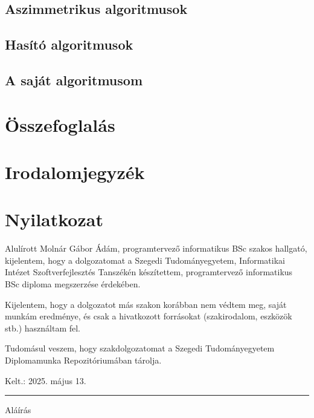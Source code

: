 \documentclass[12pt]{report} %
\begin{document}
\section{Aszimmetrikus algoritmusok} %

\section{Hasító algoritmusok} %

\section{A saját algoritmusom} %

\chapter{Összefoglalás} %

\chapter*{Irodalomjegyzék} %

\printbibliography[heading=none] %

\chapter*{Nyilatkozat} %

Alulírott Molnár Gábor Ádám, programtervező informatikus BSc szakos hallgató, kijelentem, hogy a dolgozatomat a Szegedi Tudományegyetem, Informatikai Intézet Szoftverfejlesztés Tanszékén készítettem, programtervező informatikus BSc diploma megszerzése érdekében.

Kijelentem, hogy a dolgozatot más szakon korábban nem védtem meg, saját munkám eredménye, és csak a hivatkozott forrásokat (szakirodalom, eszközök stb.) használtam fel.

Tudomásul veszem, hogy szakdolgozatomat a Szegedi Tudományegyetem Diplomamunka Repozitóriumában tárolja.

\vspace{1cm}

{\large Kelt.: 2025. május 13.}

\vspace{0.5cm}
\hfill
\parbox{5cm}{\centering\hrule\vspace{0.3cm} Aláírás}
\end{document}
